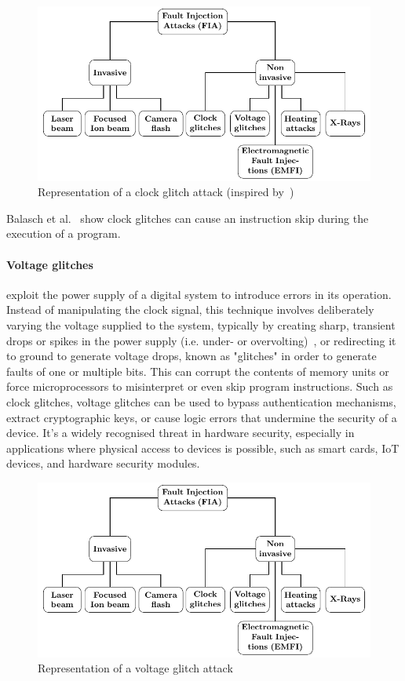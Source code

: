\begin{figure}[ht]
    \centering
    \includegraphics[page=4]{c2_soa/img/physicalAttacks.pdf}
    \caption{Representation of a clock glitch attack (inspired by~\cite{newae_clock})}
    \label{fig:clock_glitch}
\end{figure}

Balasch et al.~\cite{BGV-11-fdtc} show clock glitches can cause an instruction skip during the execution of a program.

\paragraph{Voltage glitches} exploit the power supply of a digital system to introduce errors in its operation. Instead of manipulating the clock signal, this technique involves deliberately varying the voltage supplied to the system, typically by creating sharp, transient drops or spikes in the power supply (i.e. under- or overvolting)~\cite{BBPP-09-fdtc}, or redirecting it to ground to generate voltage drops, known as "glitches" in order to generate faults of one or multiple bits. This can corrupt the contents of memory units or force microprocessors to misinterpret or even skip program instructions.
Such as clock glitches, voltage glitches can be used to bypass authentication mechanisms, extract cryptographic keys, or cause logic errors that undermine the security of a device. It's a widely recognised threat in hardware security, especially in applications where physical access to devices is possible, such as smart cards, IoT devices, and hardware security modules.

\begin{figure}[ht]
    \centering
    \includegraphics[page=6, scale=1.25]{c2_soa/img/physicalAttacks.pdf}
    \caption{Representation of a voltage glitch attack}
    \label{fig:voltage_glitch}
\end{figure}

